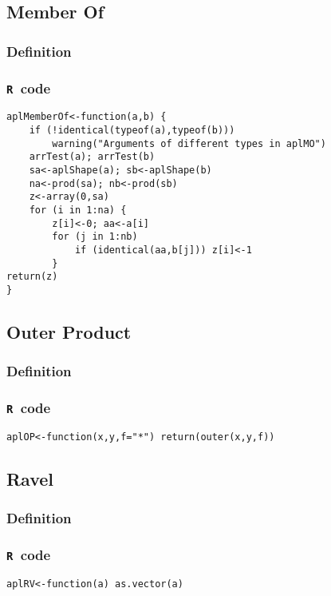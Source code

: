 \documentclass[11pt]{amsart}
\theoremstyle{plain}
\theoremstyle{definition}
\theoremstyle{remark}
\newcommand{\tR}{\texttt{R}}
\begin{document}
\subsection{Member Of}\quad
\subsubsection{Definition}

\subsubsection{\tR\ code}\quad
\begin{lstlisting}
aplMemberOf<-function(a,b) {
    if (!identical(typeof(a),typeof(b)))
        warning("Arguments of different types in aplMO")
    arrTest(a); arrTest(b)
    sa<-aplShape(a); sb<-aplShape(b)
    na<-prod(sa); nb<-prod(sb)
    z<-array(0,sa)
    for (i in 1:na) {
        z[i]<-0; aa<-a[i]
        for (j in 1:nb)
            if (identical(aa,b[j])) z[i]<-1
        }
return(z)   
}
\end{lstlisting}

\subsection{Outer Product}\quad
\subsubsection{Definition}
\subsubsection{\tR\ code}\quad

\begin{lstlisting}
aplOP<-function(x,y,f="*") return(outer(x,y,f))
\end{lstlisting}

\subsection{Ravel}\quad
\subsubsection{Definition}
\subsubsection{\tR\ code}\quad
\begin{lstlisting}
aplRV<-function(a) as.vector(a)
\end{lstlisting}
\end{document}
